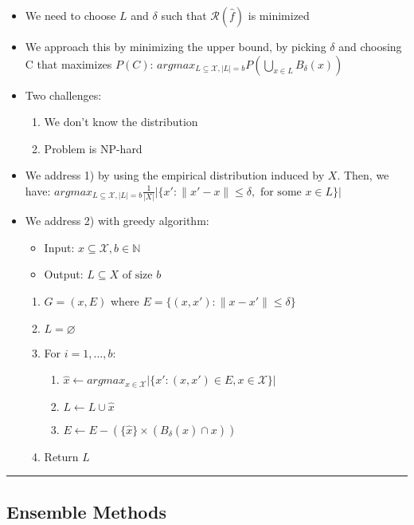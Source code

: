 \begin{itemize}
    \item We need to choose $L$ and $\delta$ such that $\mathcal{R}(\hat{f})$ is minimized
    \item We approach this by minimizing the upper bound, by picking $\delta$ and choosing C that maximizes $P(C)$:
    $argmax_{L \subseteq \mathcal{X}, |L| = b} P(\bigcup_{x \in L} B_\delta(x))$
    \item Two challenges:
    \begin{enumerate}
        \item We don't know the distribution
        \item Problem is NP-hard
    \end{enumerate}
    \item We address 1) by using the empirical distribution induced by $X$. Then, we have: $argmax_{L \subseteq \mathcal{X}, |L| = b} \frac{1}{|X|} | \{ x': \|x'-x\| \leq \delta, \textrm{ for some } x \in L \} |$
    \item We address 2) with greedy algorithm:
    \begin{itemize}
        \item Input: $x \subseteq \mathcal{X}, b \in \mathbb{N}$
        \item Output: $L \subseteq X \textrm{ of size } b$
    \end{itemize}
    \begin{enumerate}
        \item $G = (x,E)$ where $E = \{ (x,x') : \| x - x' \| \leq \delta \}$
        \item $L = \varnothing$
        \item For $i = 1, ..., b$:
        \begin{enumerate}
            \item $\hat{x} \leftarrow argmax_{x \in \mathcal{X}} | \{ x': (x,x') \in E, x \in \mathcal{X} \} |$
            \item $L \leftarrow L \cup {\hat{x}}$
            \item $E \leftarrow E - (\{ \hat{x} \} \times (B_\delta(\hat{x}) \cap x))$
        \end{enumerate}
        \item Return $L$
    \end{enumerate}
\end{itemize}

{\color{black}\hrule height 0.001mm}

\subsection*{Ensemble Methods}

